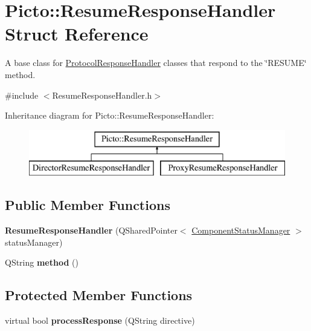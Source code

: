 \hypertarget{struct_picto_1_1_resume_response_handler}{\section{Picto\-:\-:Resume\-Response\-Handler Struct Reference}
\label{struct_picto_1_1_resume_response_handler}
}


A base class for \hyperlink{struct_picto_1_1_protocol_response_handler}{Protocol\-Response\-Handler} classes that respond to the \char`\"{}\-R\-E\-S\-U\-M\-E\char`\"{} method.  




{\ttfamily \#include $<$Resume\-Response\-Handler.\-h$>$}

Inheritance diagram for Picto\-:\-:Resume\-Response\-Handler\-:\begin{figure}[H]
\begin{center}
\leavevmode
\includegraphics[height=2.000000cm]{struct_picto_1_1_resume_response_handler}
\end{center}
\end{figure}
\subsection*{Public Member Functions}
\begin{DoxyCompactItemize}
\item 
\hypertarget{struct_picto_1_1_resume_response_handler_aa02ab14bbabb11cf9a578fc1b4428ae9}{{\bfseries Resume\-Response\-Handler} (Q\-Shared\-Pointer$<$ \hyperlink{class_component_status_manager}{Component\-Status\-Manager} $>$ status\-Manager)}\label{struct_picto_1_1_resume_response_handler_aa02ab14bbabb11cf9a578fc1b4428ae9}

\item 
\hypertarget{struct_picto_1_1_resume_response_handler_a1679bd6f019fa2fa817bdd4d6803fbfc}{Q\-String {\bfseries method} ()}\label{struct_picto_1_1_resume_response_handler_a1679bd6f019fa2fa817bdd4d6803fbfc}

\end{DoxyCompactItemize}
\subsection*{Protected Member Functions}
\begin{DoxyCompactItemize}
\item 
\hypertarget{struct_picto_1_1_resume_response_handler_a163fca76da5682d9954aa62e6b72e76b}{virtual bool {\bfseries process\-Response} (Q\-String directive)}\label{struct_picto_1_1_resume_response_handler_a163fca76da5682d9954aa62e6b72e76b}

\end{DoxyCompactItemize}


